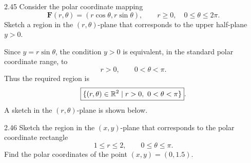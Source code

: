 \documentclass[11pt,oneside]{article}
\begin{document}

\begin{problem}{2.45}
Consider the polar coordinate mapping
\[
    \mathbf F(r,\theta)=(r\cos\theta,r\sin\theta),
    \qquad
    r\geq0,
    \quad
    0\leq\theta\leq2\pi.
\]
Sketch a region in the $(r,\theta)$-plane that corresponds to the upper half-plane $y>0$.
\end{problem}

\begin{solution}
Since $y=r\sin\theta$, the condition $y>0$ is equivalent, in the standard polar coordinate range, to
\[
    r>0,
    \qquad
    0<\theta<\pi.
\]
Thus the required region is
\[
    \boxed{\{(r,\theta)\in\R^2\mid r>0,\ 0<\theta<\pi\}}.
\]
A sketch in the $(r,\theta)$-plane is shown below.

\begin{center}
\end{center}
\end{solution}

\begin{problem}{2.46}
Sketch the region in the $(x,y)$-plane that corresponds to the polar coordinate rectangle
\[
    1\leq r\leq2,
    \qquad
    0\leq\theta\leq\pi.
\]
Find the polar coordinates of the point $(x,y)=(0,1.5)$.
\end{problem}
\end{document}
